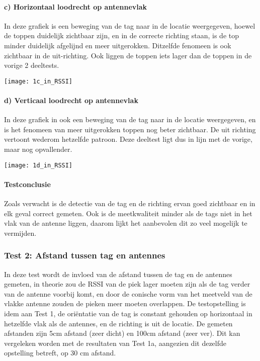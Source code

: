\paragraph{c) Horizontaal loodrecht op antennevlak}
\begin{minipage}{0.55\textwidth}
In deze grafiek is een beweging van de tag naar in de locatie weergegeven, hoewel de toppen duidelijk zichtbaar zijn, en in de correcte richting staan, is de top minder duidelijk afgelijnd en meer uitgerokken. Ditzelfde fenomeen is ook zichtbaar in de uit-richting. Ook liggen de toppen iets lager dan de toppen in de vorige 2 deeltests.
\end{minipage}
\hfill
\begin{minipage}{0.42\textwidth}
	\texttt{[image: 1c\_in\_RSSI]}
	\label{fig:ond-rfid-static-1c-res}
\end{minipage}

\paragraph{d) Verticaal loodrecht op antennevlak}
\begin{minipage}{0.55\textwidth}
In deze grafiek in ook een beweging van de tag naar in de locatie weergegeven, en is het fenomeen van meer uitgerokken toppen nog beter zichtbaar. De uit richting vertoont wederom hetzelfde patroon. Deze deeltest ligt dus in lijn met de vorige, maar nog opvallender.
\end{minipage}
\hfill
\begin{minipage}{0.42\textwidth}
	\texttt{[image: 1d\_in\_RSSI]}
	\label{fig:ond-rfid-static-1d-res}
\end{minipage}

\paragraph{Testconclusie}
Zoals verwacht is de detectie van de tag en de richting ervan goed zichtbaar en in elk geval correct gemeten. Ook is de meetkwaliteit minder als de tags niet in het vlak van de antenne liggen, daarom lijkt het aanbevolen dit zo veel mogelijk te vermijden.

\subsubsection{Test 2: Afstand tussen tag en antennes}
In deze test wordt de invloed van de afstand tussen de tag en de antennes gemeten, in theorie zou de RSSI van de piek lager moeten zijn als de tag verder van de antenne voorbij komt, en door de conische vorm van het meetveld van de vlakke antenne zouden de pieken meer moeten overlappen. De testopstelling is idem aan Test 1, de oriëntatie van de tag is constant gehouden op horizontaal in hetzelfde vlak als de antennes, en de richting is uit de locatie. De gemeten afstanden zijn 5cm afstand (zeer dicht) en 100cm afstand (zeer ver). Dit kan vergeleken worden met de resultaten van Test 1a, aangezien dit dezelfde opstelling betreft, op 30 cm afstand.

